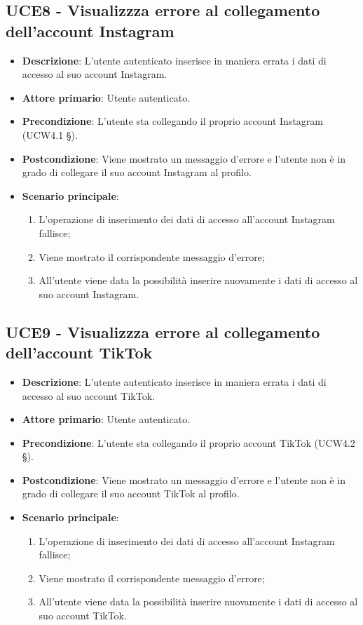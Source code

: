 \subsection{UCE8 - Visualizzza errore al collegamento dell'account Instagram}
\begin{itemize}
\item \textbf{Descrizione}: L'utente autenticato inserisce in maniera errata i dati di accesso al suo account Instagram.
\item \textbf{Attore primario}: Utente autenticato.
\item \textbf{Precondizione}: L'utente sta collegando il proprio account Instagram (UCW4.1 §).
\item \textbf{Postcondizione}: Viene mostrato un messaggio d'errore e l'utente non è in grado di collegare il suo account Instagram al profilo.

\item \textbf{Scenario principale}:
\begin{enumerate}
\item L'operazione di inserimento dei dati di accesso all'account Instagram fallisce;
\item Viene mostrato il corrispondente messaggio d'errore;
\item All'utente viene data la possibilità inserire nuovamente i dati di accesso al suo account Instagram.
\end{enumerate}
\end{itemize}

\subsection{UCE9 - Visualizzza errore al collegamento dell'account TikTok}
\begin{itemize}
\item \textbf{Descrizione}: L'utente autenticato inserisce in maniera errata i dati di accesso al suo account TikTok.
\item \textbf{Attore primario}: Utente autenticato.
\item \textbf{Precondizione}: L'utente sta collegando il proprio account TikTok (UCW4.2 §).
\item \textbf{Postcondizione}: Viene mostrato un messaggio d'errore e l'utente non è in grado di collegare il suo account TikTok al profilo.

\item \textbf{Scenario principale}:
\begin{enumerate}
\item L'operazione di inserimento dei dati di accesso all'account Instagram fallisce;
\item Viene mostrato il corrispondente messaggio d'errore;
\item All'utente viene data la possibilità inserire nuovamente i dati di accesso al suo account TikTok.
\end{enumerate}
\end{itemize}